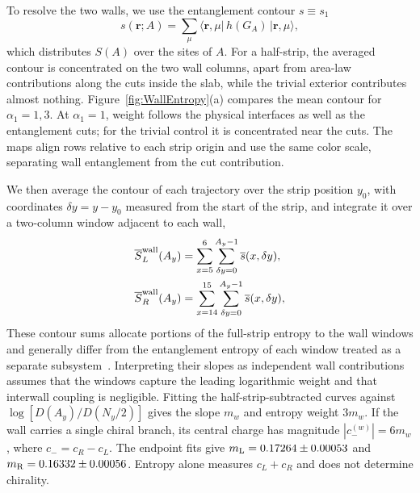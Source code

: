 \documentclass[aps,prb,10pt,twocolumn,superscriptaddress,longbibliography,floatfix]{revtex4-2}
\newcommand{\bfr}{\boldsymbol r}
\newcommand{\newtext}[1]{{\color{blue}#1}}
\begin{document}
{\color{blue}
To resolve the two walls, we use the entanglement contour $s\equiv s_1$~\cite{BhuiyanPanJian2026}
\begin{equation}
    s(\bfr;A)=\sum_\mu\langle\bfr,\mu|\,h(G_A)\,|\bfr,\mu\rangle,
    \label{eq:Contour}
\end{equation}
which distributes $S(A)$ over the sites of $A$. For a half-strip, the averaged contour is concentrated on the two wall columns, apart from area-law contributions along the cuts inside the slab, while the trivial exterior contributes almost nothing.
\newtext{Figure~\ref{fig:WallEntropy}(a) compares the mean contour for $\alpha_1=1,3$. At $\alpha_1=1$, weight follows the physical interfaces as well as the entanglement cuts; for the trivial control it is concentrated near the cuts. The maps align rows relative to each strip origin and use the same color scale, separating wall entanglement from the cut contribution.}

We then average the contour of each trajectory over the strip position $y_0$, with coordinates $\delta y=y-y_0$ measured from the start of the strip, and integrate it over a two-column window adjacent to each wall,
\begin{align}
    \overline{S}^{\rm wall}_{L}(A_y)&=\sum_{x=5}^{6}\sum_{\delta y=0}^{A_y-1}\overline{s}(x,\delta y),\nonumber\\
    \overline{S}^{\rm wall}_{R}(A_y)&=\sum_{x=14}^{15}\sum_{\delta y=0}^{A_y-1}\overline{s}(x,\delta y),
    \label{eq:WallEntropy}
\end{align}
These contour sums allocate portions of the full-strip entropy to the wall windows and generally differ from the entanglement entropy of each window treated as a separate subsystem~\cite{ChenVidal2014}. Interpreting their slopes as independent wall contributions assumes that the windows capture the leading logarithmic weight and that interwall coupling is negligible.
\newtext{Fitting the half-strip-subtracted curves against $\log[D(A_y)/D(N_y/2)]$ gives the slope $m_w$ and entropy weight $3m_w$. If the wall carries a single chiral branch, its central charge has magnitude $|c_-^{(w)}|=6m_w$, where $c_-=c_R-c_L$. The endpoint fits give $m_{\rm L}=0.17264\pm0.00053$ and $m_{\rm R}=0.16332\pm0.00056$. Entropy alone measures $c_L+c_R$ and does not determine chirality.}
}
\end{document}
